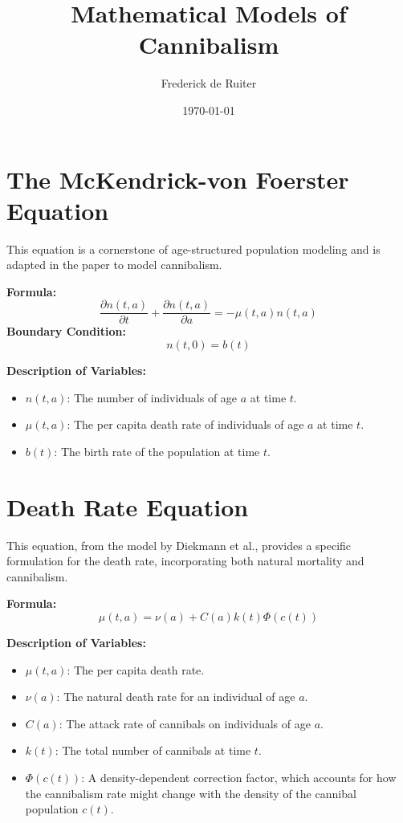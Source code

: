 \documentclass[12pt]{article}
\title{Mathematical Models of Cannibalism}
\author{Frederick de Ruiter}
\date{\today}
\begin{document}
\maketitle

\section{The McKendrick-von Foerster Equation}

This equation is a cornerstone of age-structured population modeling and is adapted in the paper to model cannibalism.

\textbf{Formula:}
\begin{equation}
\frac{\partial n(t, a)}{\partial t} + \frac{\partial n(t, a)}{\partial a} = -\mu(t, a) n(t, a)
\end{equation}
\textbf{Boundary Condition:}
\begin{equation}
n(t, 0) = b(t)
\end{equation}

\textbf{Description of Variables:}
\begin{itemize}
    \item \(n(t, a)\): The number of individuals of age \(a\) at time \(t\).
    \item \(\mu(t, a)\): The per capita death rate of individuals of age \(a\) at time \(t\).
    \item \(b(t)\): The birth rate of the population at time \(t\).
\end{itemize}

\section{Death Rate Equation}

This equation, from the model by Diekmann et al., provides a specific formulation for the death rate, incorporating both natural mortality and cannibalism.

\textbf{Formula:}
\begin{equation}
\mu(t, a) = \nu(a) + C(a)k(t)\Phi(c(t))
\end{equation}

\textbf{Description of Variables:}
\begin{itemize}
    \item \(\mu(t, a)\): The per capita death rate.
    \item \(\nu(a)\): The natural death rate for an individual of age \(a\).
    \item \(C(a)\): The attack rate of cannibals on individuals of age \(a\).
    \item \(k(t)\): The total number of cannibals at time \(t\).
    \item \(\Phi(c(t))\): A density-dependent correction factor, which accounts for how the cannibalism rate might change with the density of the cannibal population \(c(t)\).
\end{itemize}
\end{document}
